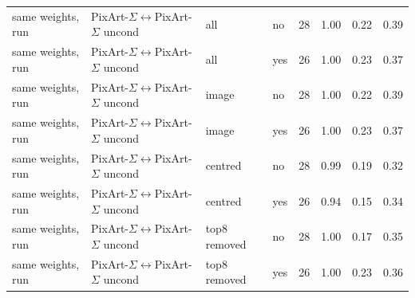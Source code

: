 \begin{table}[htbp]
\begin{tabularx}{\linewidth}{@{}Llllcccc@{}}
same weights, run & PixArt-$\Sigma$$\leftrightarrow$PixArt-$\Sigma$ uncond & all & no & 28 & 1.00 & 0.22 & 0.39\\
same weights, run & PixArt-$\Sigma$$\leftrightarrow$PixArt-$\Sigma$ uncond & all & yes & 26 & 1.00 & 0.23 & 0.37\\
same weights, run & PixArt-$\Sigma$$\leftrightarrow$PixArt-$\Sigma$ uncond & image & no & 28 & 1.00 & 0.22 & 0.39\\
same weights, run & PixArt-$\Sigma$$\leftrightarrow$PixArt-$\Sigma$ uncond & image & yes & 26 & 1.00 & 0.23 & 0.37\\
same weights, run & PixArt-$\Sigma$$\leftrightarrow$PixArt-$\Sigma$ uncond & centred & no & 28 & 0.99 & 0.19 & 0.32\\
same weights, run & PixArt-$\Sigma$$\leftrightarrow$PixArt-$\Sigma$ uncond & centred & yes & 26 & 0.94 & 0.15 & 0.34\\
same weights, run & PixArt-$\Sigma$$\leftrightarrow$PixArt-$\Sigma$ uncond & top8 removed & no & 28 & 1.00 & 0.17 & 0.35\\
same weights, run & PixArt-$\Sigma$$\leftrightarrow$PixArt-$\Sigma$ uncond & top8 removed & yes & 26 & 1.00 & 0.23 & 0.36\\
\bottomrule
\end{tabularx}
\end{table}

